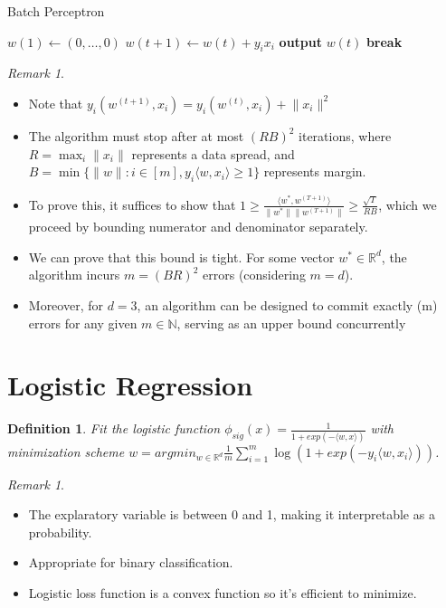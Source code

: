 \documentclass{article}
\newtheorem{definition}{Definition}
\theoremstyle{remark}
\newtheorem{remark}[example]{Remark}
\begin{document}
\begin{algorithm}[H]
    \caption{Batch Perceptron}
    \begin{algorithmic}[1]
        \State $w(1) \gets (0, \ldots, 0)$
                \State $w(t+1) \gets w(t) + y_i x_i$
            \Else
                \State \textbf{output} $w(t)$
                \State \textbf{break}
            \EndIf
        \EndFor
    \EndFunction
    \end{algorithmic}
\end{algorithm}

\begin{remark}
\begin{itemize}
\item Note that $y_i(w^{(t+1)}, x_i)=y_i(w^{(t)}, x_i)+\lVert x_i\rVert^2$
\item The algorithm must stop after at most $(RB)^2$ iterations, where $R=\max_i\lVert x_i\rVert$ represents a data spread, and $B=\min\{\lVert w\rVert: i\in[m], y_i\langle w,x_i\rangle\geq 1\}$ represents 
margin.
\item To prove this, it suffices to show that $1\geq\frac{\langle w^*, w^{(T+1)}\rangle}{\lVert w^*\rVert\lVert w^{(T+1)}\rVert}\geq\frac{\sqrt T}{RB}$, which we proceed by bounding numerator and denominator separately.
\item We can prove that this bound is tight. For some vector $w^* \in \mathbb{R}^d$, the algorithm incurs $m = (BR)^2$ errors (considering $m = d$).
\item Moreover, for $d = 3$, an algorithm can be designed to commit exactly (m) errors for any given $m \in \mathbb{N}$, serving as an upper bound concurrently        \end{itemize}
\end{remark}

\section*{Logistic Regression}
\begin{definition}
Fit the logistic function $\phi_{sig}(x)=\frac 1{1+exp(-\langle w,x\rangle)}$ with minimization scheme $w=argmin_{w\in\mathbb{R}^d} \frac 1m\sum^m_{i=1} \log(1+exp(-y_i\langle w,x_i\rangle))$.
\end{definition}
\begin{remark}
\begin{itemize}
\item The explaratory variable is between 0 and 1, making it interpretable as a probability.
\item Appropriate for binary classification.
\item Logistic loss function is a convex function so it's efficient to minimize.
\end{itemize}
\end{remark}
\end{document}
